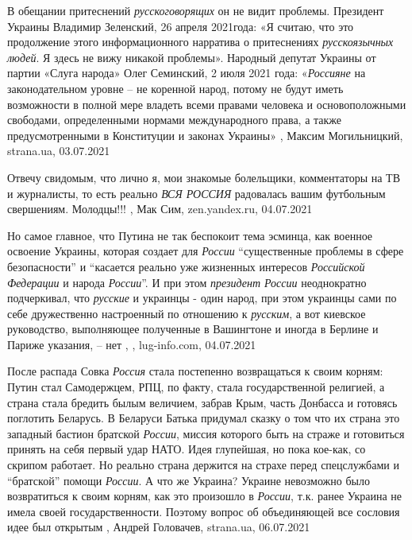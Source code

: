 В обещании притеснений \emph{русскоговорящих} он не видит проблемы.  Президент Украины
Владимир Зеленский, 26 апреля 2021года: «Я считаю, что это продолжение этого
информационного нарратива о притеснениях \emph{русскоязычных людей}. Я здесь не вижу
никакой проблемы».  Народный депутат Украины от партии «Слуга народа» Олег
Семинский, 2 июля 2021 года: «\emph{Россияне} на законодательном уровне – не коренной
народ, потому не будут иметь возможности в полной мере владеть всеми правами
человека и основоположными свободами, определенными нормами международного
права, а также предусмотренными в Конституции и законах Украины»
, 
Максим Могильницкий, strana.ua, 03.07.2021

Отвечу свидомым, что лично я, мои знакомые болельщики, комментаторы на ТВ и
журналисты, то есть реально \emph{ВСЯ РОССИЯ} радовалась вашим футбольным свершениям.
Молодцы!!!
, Мак Сим,
zen.yandex.ru, 04.07.2021

Но самое главное, что Путина не так беспокоит тема эсминца, как военное
освоение Украины, которая создает для \emph{России} \enquote{существенные проблемы в сфере
безопасности} и \enquote{касается реально уже жизненных интересов \emph{Российской Федерации}
и народа \emph{России}}. И при этом \emph{президент России} неоднократно подчеркивал, что
\emph{русские} и украинцы - один народ, при этом украинцы сами по себе дружественно
настроенный по отношению к \emph{русским}, а вот киевское руководство, выполняющее
полученные в Вашингтоне и иногда в Берлине и Париже указания, – нет
, , lug-info.com, 04.07.2021

После распада Совка \emph{Россия} стала постепенно возвращаться к своим корням:
Путин стал Самодержцем, РПЦ, по факту, стала государственной религией, а страна
стала бредить былым величием, забрав Крым, часть Донбасса и готовясь поглотить
Беларусь.  В Беларуси Батька придумал сказку о том что их страна это западный
бастион братской \emph{России}, миссия которого быть на страже и готовиться
принять на себя первый удар НАТО. Идея глупейшая, но пока кое-как, со скрипом
работает. Но реально страна держится на страхе перед спецслужбами и \enquote{братской}
помощи \emph{России}. А что же Украина? Украине невозможно было возвратиться
к своим корням, как это произошло в \emph{России}, т.к. ранее Украина не имела
своей государственности. Поэтому вопрос об объединяющей все сословия идее был
открытым
, 
Андрей Головачев, strana.ua, 06.07.2021

